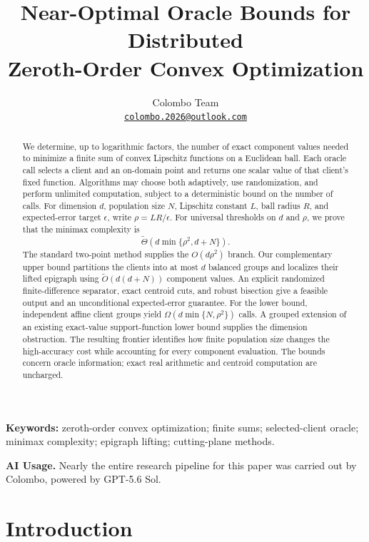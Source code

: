 \documentclass[11pt]{article}
\title{Near-Optimal Oracle Bounds for Distributed\\
Zeroth-Order Convex Optimization}
\author{Colombo Team\\[0.3em]
\normalsize\href{mailto:colombo.2026@outlook.com}{\texttt{colombo.2026@outlook.com}}}
\date{}
\numberwithin{equation}{section}
\theoremstyle{remark}
\theoremstyle{definition}
\newcommand{\eps}{\epsilon}
\begin{document}
\maketitle

\begin{abstract}
We determine, up to logarithmic factors, the number of exact component
values needed to minimize a finite sum of convex Lipschitz functions on a
Euclidean ball. Each oracle call selects a client and an on-domain point
and returns one scalar value of that client's fixed function. Algorithms
may choose both adaptively, use randomization, and perform unlimited
computation, subject to a deterministic bound on the number of calls.
For dimension $d$, population size $N$, Lipschitz constant $L$, ball
radius $R$, and expected-error target $\eps$, write $\rho=LR/\eps$.
For universal thresholds on $d$ and $\rho$, we prove that the minimax
complexity is
\[
\widetilde\Theta\!\left(d\min\{\rho^2,d+N\}\right).
\]
The standard two-point method supplies the $O(d\rho^2)$ branch.
Our complementary upper bound partitions the clients into at most $d$
balanced groups and localizes their lifted epigraph using
$\widetilde O(d(d+N))$ component values. An explicit randomized
finite-difference separator, exact centroid cuts, and robust bisection
give a feasible output and an unconditional expected-error guarantee.
For the lower bound, independent affine client groups yield
$\Omega(d\min\{N,\rho^2\})$ calls. A grouped extension of an existing
exact-value support-function lower bound supplies the dimension
obstruction. The resulting frontier identifies how finite population
size changes the high-accuracy cost while accounting for every component
evaluation. The bounds concern oracle information; exact real arithmetic
and centroid computation are uncharged.
\end{abstract}

\noindent\textbf{Keywords:} zeroth-order convex optimization; finite sums;
selected-client oracle; minimax complexity; epigraph lifting;
cutting-plane methods.

\begin{samepage}
\noindent\textbf{AI Usage.}
Nearly the entire research pipeline for this paper was carried out by
Colombo, powered by GPT-5.6 Sol.
\par
\end{samepage}

\section{Introduction}
\label{sec:introduction}
\end{document}
